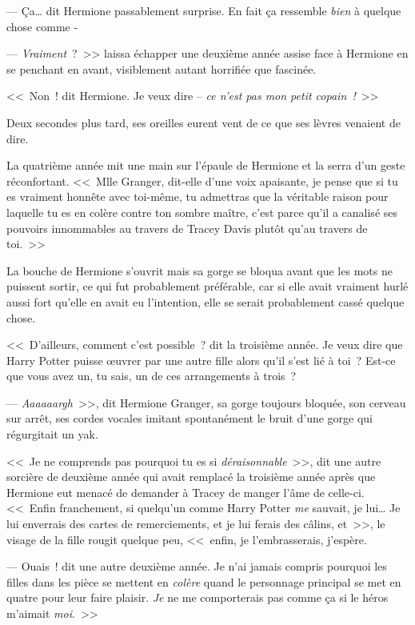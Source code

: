 --- Ça… dit Hermione passablement surprise. En fait ça ressemble \emph{bien} à quelque chose comme -

--- \emph{Vraiment}~?~>> laissa échapper une deuxième année assise face à Hermione en se penchant en avant, visiblement autant horrifiée que fascinée.

<<~Non~! dit Hermione. Je veux dire -- \emph{ce n'est pas mon petit copain~!}~>>

Deux secondes plus tard, ses oreilles eurent vent de ce que ses lèvres venaient de dire.

La quatrième année mit une main sur l'épaule de Hermione et la serra d'un geste réconfortant. <<~Mlle Granger, dit-elle d'une voix apaisante, je pense que si tu es vraiment honnête avec toi-même, tu admettras que la véritable raison pour laquelle tu es en colère contre ton sombre maître, c'est parce qu'il a canalisé ses pouvoirs innommables au travers de Tracey Davis plutôt qu'au travers de toi.~>>

La bouche de Hermione s'ouvrit mais sa gorge se bloqua avant que les mots ne puissent sortir, ce qui fut probablement préférable, car si elle avait vraiment hurlé aussi fort qu'elle en avait eu l'intention, elle se serait probablement cassé quelque chose.

<<~D'ailleurs, comment c'est possible~? dit la troisième année. Je veux dire que Harry Potter puisse œuvrer par une autre fille alors qu'il s'est lié à toi~? Est-ce que vous avez un, tu sais, un de ces arrangements à trois~?

--- \emph{Aaaaaargh}~>>, dit Hermione Granger, sa gorge toujours bloquée, son cerveau sur arrêt, ses cordes vocales imitant spontanément le bruit d'une gorge qui régurgitait un yak.


<<~Je ne comprends pas pourquoi tu es si \emph{déraisonnable}~>>, dit une autre sorcière de deuxième année qui avait remplacé la troisième année après que Hermione eut menacé de demander à Tracey de manger l'âme de celle-ci. <<~Enfin franchement, si quelqu'un comme Harry Potter \emph{me} sauvait, je lui… Je lui enverrais des cartes de remerciements, et je lui ferais des câlins, et~>>, le visage de la fille rougit quelque peu, <<~enfin, je l'embrasserais, j'espère.

--- Ouais~! dit une autre deuxième année. Je n'ai jamais compris pourquoi les filles dans les pièce se mettent en \emph{colère} quand le personnage principal se met en quatre pour leur faire plaisir. \emph{Je} ne me comporterais pas comme ça si le héros m'aimait \emph{moi}.~>>


